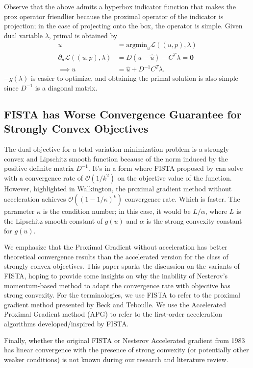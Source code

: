 \documentclass[]{article}
\theoremstyle{definition}
\numberwithin{equation}{subsection}
\begin{document}
        Observe that the above admits a hyperbox indicator function that makes the prox operator friendlier because the proximal operator of the indicator is projection; in the case of projecting onto the box, the operator is simple. 
        Given dual variable $\lambda$, primal is obtained by 
        \begin{align*}
            u &= \text{argmin}_u \mathcal L((u, p), \lambda) 
            \\
            \partial_u \mathcal L((u, p), \lambda) &= D(u - \hat u) - C^T\lambda = \mathbf 0
            \\
            \implies u &= \hat u + D^{-1}C^T\lambda. 
        \end{align*}
        $-g(\lambda)$ is easier to optimize, and obtaining the primal solution is also simple since $D^{-1}$ is a diagonal matrix. 
    \subsection{FISTA has Worse Convergence Guarantee for Strongly Convex Objectives}
        The dual objective for a total variation minimization problem is a strongly convex and Lipschitz smooth function because of the norm induced by the positive definite matrix $D^{-1}$. 
        It's in a form where FISTA proposed by \cite{beck_fast_2009-1} can solve with a convergence rate of $\mathcal O(1/k^2)$ on the objective value of the function. 
        However, highlighted in Walkington\cite{noel_nesterovs_nodate}, the proximal gradient method without acceleration achieves $\mathcal O\left((1 - 1/\kappa)^k\right)$ convergence rate. 
        Which is faster.
        The parameter $\kappa$ is the condition number; in this case, it would be $L/\alpha$, where $L$ is the Lipschitz smooth constant of $g(u)$ and $\alpha$ is the strong convexity constant for $g(u)$. 
        \par
        We emphasize that the Proximal Gradient without acceleration has better theoretical convergence results than the accelerated version for the class of strongly convex objectives. 
        This paper sparks the discussion on the variants of FISTA, hoping to provide some insights on why the inability of Nesterov's momentum-based method to adapt the convergence rate with objective has strong convexity. 
        For the terminologies, we use FISTA to refer to the proximal gradient method presented by Beck and Teboulle\cite{beck_fast_2009-1}. We use the Accelerated Proximal Gradient method (APG) to refer to the first-order acceleration algorithms developed/inspired by FISTA. 
        \par
        Finally, whether the original FISTA\cite{beck_fast_2009} or Nesterov Accelerated gradient from 1983 has linear convergence with the presence of strong convexity (or potentially other weaker conditions) is not known during our research and literature review. 
\end{document}
